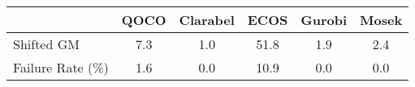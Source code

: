 \begin{tabular}{lccccc}
  \hline
   & \textbf{QOCO} & \textbf{Clarabel} & \textbf{ECOS} & \textbf{Gurobi} & \textbf{Mosek} \\ \hline
  Shifted GM & 7.3 & 1.0 & 51.8 & 1.9 & 2.4 \\ 
  Failure Rate (\%) & 1.6 & 0.0 & 10.9 & 0.0 & 0.0 \\ \hline 
\end{tabular}
